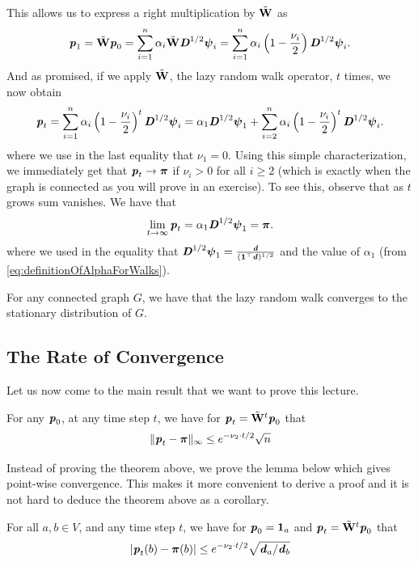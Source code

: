 This allows us to express a right multiplication by ${\tilde{\mathbf{W}}}$ as
\[
    \boldsymbol{\mathit{p}}_1 = {\tilde{\mathbf{W}}} \boldsymbol{\mathit{p}}_0 = \sum_{i=1}^n \alpha_i {\tilde{\mathbf{W}}} \boldsymbol{\mathit{D}}^{1/2} \boldsymbol{\mathit{\psi}}_i = \sum_{i=1}^n \alpha_i \left(1-\frac{\nu_i}{2}\right) \boldsymbol{\mathit{D}}^{1/2} \boldsymbol{\mathit{\psi}}_i.
\]
And as promised, if we apply ${\tilde{\mathbf{W}}}$, the lazy random walk operator, $t$ times, we now obtain
\begin{align}\label{eq:distributionRandomWalkTSteps}
    \boldsymbol{\mathit{p}}_t = \sum_{i=1}^n \alpha_i \left(1-\frac{\nu_i}{2}\right)^t \boldsymbol{\mathit{D}}^{1/2} \boldsymbol{\mathit{\psi}}_i = \alpha_1 \boldsymbol{\mathit{D}}^{1/2} \boldsymbol{\mathit{\psi}}_1 + \sum_{i=2}^n \alpha_i \left(1-\frac{\nu_i}{2}\right)^t \boldsymbol{\mathit{D}}^{1/2} \boldsymbol{\mathit{\psi}}_i.
\end{align}
where we use in the last equality that $\nu_1 = 0$. Using this simple characterization, we immediately get that $\boldsymbol{\mathit{p}}_t \to \boldsymbol{\pi}$ if $\nu_i > 0$ for all $i \geq 2$ (which is exactly when the graph is connected as you will prove in an exercise). To see this, observe that as $t$ grows sum vanishes. We have that
\[
    \lim_{t \to \infty} \boldsymbol{\mathit{p}}_t = \alpha_1 \boldsymbol{\mathit{D}}^{1/2} \boldsymbol{\mathit{\psi}}_1 = \boldsymbol{\pi}.
\]
where we used in the equality that $\boldsymbol{\mathit{D}}^{1/2} \boldsymbol{\mathit{\psi}}_1 = \frac{\boldsymbol{\mathit{d}} }{(\boldsymbol{1}^{\top} \boldsymbol{\mathit{d}})^{1/2}}$ and the value of $\alpha_1$ (from \ref{eq:definitionOfAlphaForWalks}).

\begin{theorem}
For any connected graph $G$, we have that the lazy random walk converges to the stationary distribution of $G$.
\end{theorem}

\subsection{The Rate of Convergence}

Let us now come to the main result that we want to prove this lecture. 

\begin{theorem}
For any $\boldsymbol{\mathit{p}}_0$, at any time step $t$, we have for $\boldsymbol{\mathit{p}}_t = {\tilde{\mathbf{W}}}^t \boldsymbol{\mathit{p}}_0$ that
\[
\| \boldsymbol{\mathit{p}}_t - \boldsymbol{\pi} \|_{\infty}  \leq e^{-\nu_2 \cdot t/2} \sqrt{n} 
\]
\end{theorem}

Instead of proving the theorem above, we prove the lemma below which gives point-wise convergence. This makes it more convenient to derive a proof and it is not hard to deduce the theorem above as a corollary.

\begin{lemma}
For all $a,b \in V$, and any time step $t$, we have for $\boldsymbol{\mathit{p}}_0 = \boldsymbol{1}_a$ and $\boldsymbol{\mathit{p}}_t = {\tilde{\mathbf{W}}}^t \boldsymbol{\mathit{p}}_0$ that
\[
  |\boldsymbol{\mathit{p}}_t(b) - \boldsymbol{\pi}(b)| \leq e^{-\nu_2 \cdot t/2} \sqrt{\boldsymbol{\mathit{d}}_a/\boldsymbol{\mathit{d}}_b} 
\]
\end{lemma}

